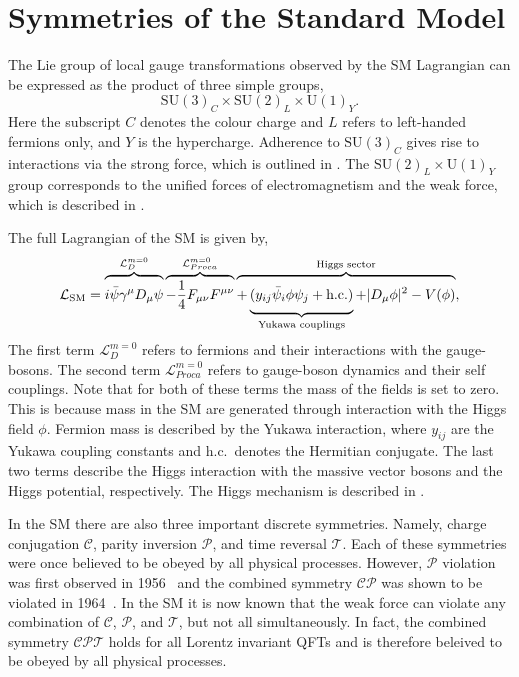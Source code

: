 \section{Symmetries of the Standard Model}
\label{sec:symmetries_of_sm}

The Lie group of local gauge transformations observed by the SM Lagrangian can be expressed as the product of three simple groups,
\begin{equation}
	\label{eq:sm_group}
	\text{SU}(3)_C \times \text{SU}(2)_L \times \text{U}(1)_Y.
\end{equation}
Here the subscript $C$ denotes the colour charge and $L$ refers to left-handed fermions only, and $Y$ is the hypercharge.
Adherence to $\text{SU}(3)_C$ gives rise to interactions via the strong force, which is outlined in .
The $\text{SU}(2)_L \times \text{U}(1)_Y$ group corresponds to the unified forces of electromagnetism and the weak force, which is described in .

The full Lagrangian of the SM is given by,
\begin{equation}
	\label{eq:sm_lagrangian}
	\mathcal{L}_\text{SM} =
	\overbrace{
		\vphantom{\frac{1}{4}}
		i \bar \psi \gamma^\mu D_\mu \psi
	}^{\mathcal{L}_{D}^{m=0}
	}
	\overbrace{
		-\frac{1}{4} F_{\mu\nu} F^{\mu\nu}
	}^{\mathcal{L}_{Proca}^{m=0}
	}
	\overbrace{
		+
		\underbrace{
			\vphantom{\frac{1}{4}}
			(y_{ij} \bar \psi_i \phi \psi_j
			+ \text{h.c.})
		}_{\text{Yukawa couplings}}
		+ |D_\mu \phi|^2
		- V(\phi)
	}^{\text{Higgs sector}},
\end{equation}
The first term $\mathcal{L}_D^{m=0}$ refers to fermions and their interactions with the gauge-bosons.
The second term $\mathcal{L}_{Proca}^{m=0}$ refers to gauge-boson dynamics and their self couplings.
Note that for both of these terms the mass of the fields is set to zero.
This is because mass in the SM are generated through interaction with the Higgs field $\phi$.
Fermion mass is described by the Yukawa interaction, where $y_{ij}$ are the Yukawa coupling constants and h.c.\ denotes the Hermitian conjugate.
The last two terms describe the Higgs interaction with the massive vector bosons and the Higgs potential, respectively.
The Higgs mechanism is described in .

In the SM there are also three important discrete symmetries.
Namely, charge conjugation $\mathcal{C}$, parity inversion $\mathcal{P}$, and time reversal $\mathcal{T}$.
Each of these symmetries were once believed to be obeyed by all physical processes.
However, $\mathcal{P}$ violation was first observed in 1956~\cite{Wu1957} and the combined symmetry $\mathcal{CP}$ was shown to be violated in 1964~\cite{CPViolation}.
In the SM it is now known that the weak force can violate any combination of $\mathcal{C}$, $\mathcal{P}$, and $\mathcal{T}$, but not all simultaneously.
In fact, the combined symmetry $\mathcal{CPT}$ holds for all Lorentz invariant QFTs and is therefore beleived to be obeyed by all physical processes.


